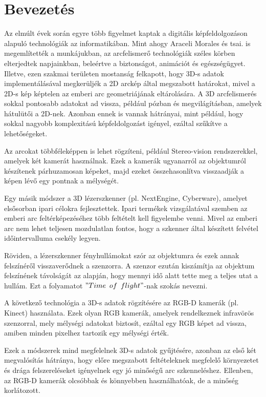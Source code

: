 \documentclass[12pt,a4]{article}
\begin{document}
    \section{Bevezetés}
        Az elmúlt évek során egyre több figyelmet kaptak a digitális képfeldolgozáson alapuló technológiák az informatikában. 
        Mint ahogy \cite{survey}Araceli Morales és tsai. is megemlítették a munkájukban, az arcfelismerő technológiák széles körben elterjedtek napjainkban, beleértve a biztonságot, animációt és egészségügyet. 
        Illetve, ezen szakmai területen mostanság felkapott, hogy 3D-s adatok implementálásával megkerüljék a 2D arckép által megszabott határokat, mivel a 2D-s kép képtelen az emberi arc geometriájának eltárolására.
        A 3D arcfelismerés sokkal pontosabb adatokat ad vissza, például pózban és megvilágításban, amelyek hátulütői a 2D-nek. Azonban ennek is vannak hátrányai, mint például, hogy sokkal nagyobb komplexitású képfeldolgozást igényel, ezáltal szűkítve a lehetőségeket.

        Az arcokat többféleképpen is lehet rögzíteni, például Stereo-vision rendszerekkel, amelyek két kamerát használnak. Ezek a kamerák ugyanarról az objektumról készítenek párhuzamosan képeket, majd ezeket összehasonlítva visszaadják a képen lévő egy pontnak a mélységét.

        Egy másik módszer a 3D lézerszkenner (pl. NextEngine, Cyberware), amelyet elsősorban ipari célokra fejlesztettek. Ipari termékek vizsgálatával szemben az emberi arc feltérképezéséhez több feltételt kell figyelembe venni. Mivel az emberi arc nem lehet teljesen mozdulatlan fontos, hogy a szkenner által készített felvétel időintervalluma csekély legyen.

        Röviden, a lézerszkenner fényhullámokat szór az objektumra és ezek annak felszínéről visszaverődnek a szenzorra. A szenzor ezután kiszámítja az objektum felszínének távolságát az alapján, hogy mennyi idő alatt tette meg a teljes utat a hullám. Ezt a folyamatot $"Time\enspace of\enspace flight"$-nak szokás nevezni.

        A következő technológia a 3D-s adatok rögzítésére az RGB-D kamerák (pl. Kinect) használata. Ezek olyan RGB kamerák, amelyek rendelkeznek infravörös szenzorral, mely mélységi adatokat biztosít, ezáltal egy RGB képet ad vissza, amiben minden pixelhez tartozik egy mélységi érték.

        Ezek a módszerek mind megfelelnek 3D-s adatok gyűjtésére, azonban az első két megvalósítás hátránya, hogy előre megszabott feltételeknek megfelelő környezetet és drága felszereléseket igényelnek egy jó minőségű arc szkenneléshez. Ellenben, az RGB-D kamerák olcsóbbak és könnyebben használhatóak, de a minőség korlátozott.
\end{document}
